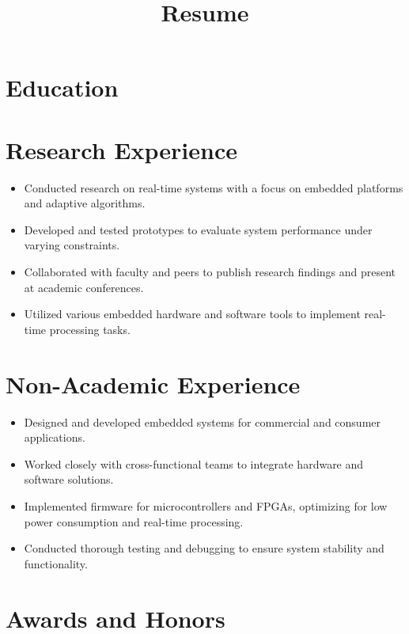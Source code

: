 \documentclass[letterpaper]{moderncv}
\title{Resume}
\begin{document}
	\makecvtitle

	\section{Education}

	\section{Research Experience}
    \begin{itemize}
    \item Conducted research on real-time systems with a focus on embedded platforms and adaptive algorithms.
    \item Developed and tested prototypes to evaluate system performance under varying constraints.
    \item Collaborated with faculty and peers to publish research findings and present at academic conferences.
    \item Utilized various embedded hardware and software tools to implement real-time processing tasks.
    \end{itemize}

  \section{Non-Academic Experience}
    \begin{itemize}
    \item Designed and developed embedded systems for commercial and consumer applications.
    \item Worked closely with cross-functional teams to integrate hardware and software solutions.
    \item Implemented firmware for microcontrollers and FPGAs, optimizing for low power consumption and real-time processing.
    \item Conducted thorough testing and debugging to ensure system stability and functionality.
    \end{itemize}

  \section{Awards and Honors}
	
\end{document}
